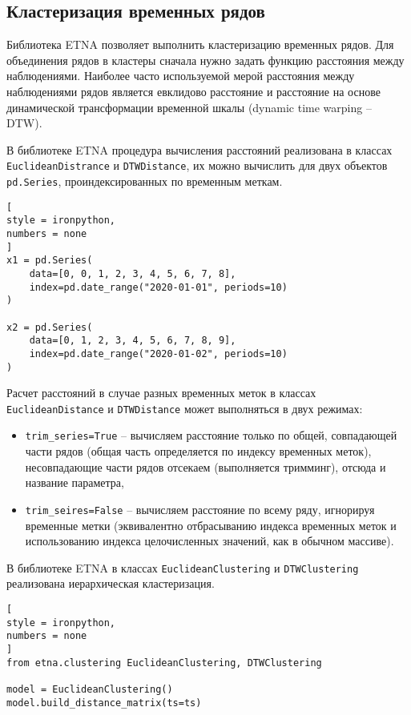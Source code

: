 \documentclass[%
	11pt,
	a4paper,
	utf8,
		]{article}
\begin{document}
\subsection{Кластеризация временных рядов}

Библиотека ETNA позволяет выполнить кластеризацию временных рядов. Для объединения рядов в кластеры сначала нужно задать функцию расстояния между наблюдениями. Наиболее часто используемой мерой расстояния между наблюдениями рядов является евклидово расстояние и расстояние на основе динамической трансформации временной шкалы (dynamic time warping -- DTW).

В библиотеке ETNA процедура вычисления расстояний реализована в классах \verb|EuclideanDistrance| и \verb|DTWDistance|, их можно вычислить для двух объектов \verb|pd.Series|, проиндексированных по временным меткам.
\begin{lstlisting}[
style = ironpython,
numbers = none
]
x1 = pd.Series(
    data=[0, 0, 1, 2, 3, 4, 5, 6, 7, 8],
    index=pd.date_range("2020-01-01", periods=10)
)

x2 = pd.Series(
    data=[0, 1, 2, 3, 4, 5, 6, 7, 8, 9],
    index=pd.date_range("2020-01-02", periods=10)
)
\end{lstlisting}

Расчет расстояний в случае разных временных меток в классах \verb|EuclideanDistance| и \verb|DTWDistance| может выполняться в двух режимах:
\begin{itemize}
	\item \verb|trim_series=True| -- вычисляем расстояние только по общей, совпадающей части рядов (общая часть определяется по индексу временных меток), несовпадающие части рядов отсекаем (выполняется тримминг), отсюда и название параметра,
	
	\item \verb|trim_seires=False| -- вычисляем расстояние по всему ряду, игнорируя временные метки (эквивалентно отбрасыванию индекса временных меток и использованию индекса целочисленных значений, как в обычном массиве).
\end{itemize}

В библиотеке ETNA в классах \verb|EuclideanClustering| и \verb|DTWClustering| реализована иерархическая кластеризация.
\begin{lstlisting}[
style = ironpython,
numbers = none
]
from etna.clustering EuclideanClustering, DTWClustering

model = EuclideanClustering()
model.build_distance_matrix(ts=ts)
\end{lstlisting}
\end{document}
